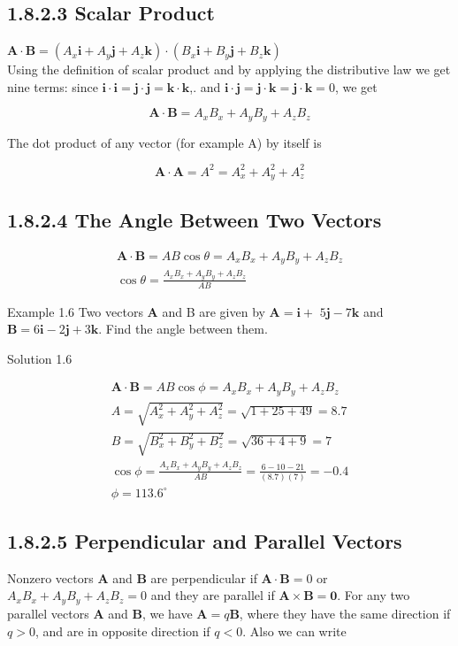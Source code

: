 \documentclass[10pt]{article}
\begin{document}
\subsection*{1.8.2.3 Scalar Product}
$\mathbf{A} \cdot \mathbf{B}=\left(A_{x} \mathbf{i}+A_{y} \mathbf{j}+A_{z} \mathbf{k}\right) \cdot\left(B_{x} \mathbf{i}+B_{y} \mathbf{j}+B_{z} \mathbf{k}\right)$\\
Using the definition of scalar product and by applying the distributive law we get nine terms: since $\mathbf{i} \cdot \mathbf{i}=\mathbf{j} \cdot \mathbf{j}=\mathbf{k} \cdot \mathbf{k}$,. and $\mathbf{i} \cdot \mathbf{j}=\mathbf{j} \cdot \mathbf{k}=\mathbf{j} \cdot \mathbf{k}=0$, we get

$$
\mathbf{A} \cdot \mathbf{B}=A_{x} B_{x}+A_{y} B_{y}+A_{z} B_{z}
$$

The dot product of any vector (for example A) by itself is

$$
\mathbf{A} \cdot \mathbf{A}=A^{2}=A_{x}^{2}+A_{y}^{2}+A_{z}^{2}
$$

\subsection*{1.8.2.4 The Angle Between Two Vectors}
$$
\begin{gathered}
\mathbf{A} \cdot \mathbf{B}=A B \cos \theta=A_{x} B_{x}+A_{y} B_{y}+A_{z} B_{z} \\
\cos \theta=\frac{A_{x} B_{x}+A_{y} B_{y}+A_{z} B_{z}}{A B}
\end{gathered}
$$

Example 1.6 Two vectors $\mathbf{A}$ and B are given by $\mathbf{A}=\mathbf{i}+$ $5 \mathbf{j}-7 \mathbf{k}$ and $\mathbf{B}=6 \mathbf{i}-2 \mathbf{j}+3 \mathbf{k}$. Find the angle between them.

Solution 1.6

$$
\begin{gathered}
\mathbf{A} \cdot \mathbf{B}=A B \cos \phi=A_{x} B_{x}+A_{y} B_{y}+A_{z} B_{z} \\
A=\sqrt{A_{x}^{2}+A_{y}^{2}+A_{z}^{2}}=\sqrt{1+25+49}=8.7 \\
B=\sqrt{B_{x}^{2}+B_{y}^{2}+B_{z}^{2}}=\sqrt{36+4+9}=7 \\
\cos \phi=\frac{A_{x} B_{x}+A_{y} B_{y}+A_{z} B_{z}}{A B}=\frac{6-10-21}{(8.7)(7)}=-0.4 \\
\phi=113.6^{\circ}
\end{gathered}
$$

\subsection*{1.8.2.5 Perpendicular and Parallel Vectors}
Nonzero vectors $\mathbf{A}$ and $\mathbf{B}$ are perpendicular if $\mathbf{A} \cdot \mathbf{B}=0$ or $A_{x} B_{x}+A_{y} B_{y}+A_{z} B_{z}=0$ and they are parallel if $\mathbf{A} \times \mathbf{B}=\mathbf{0}$. For any two parallel vectors $\mathbf{A}$ and $\mathbf{B}$, we have $\mathbf{A}=q \mathbf{B}$, where they have the same direction if $q>0$, and are in opposite direction if $q<0$. Also we can write
\end{document}
